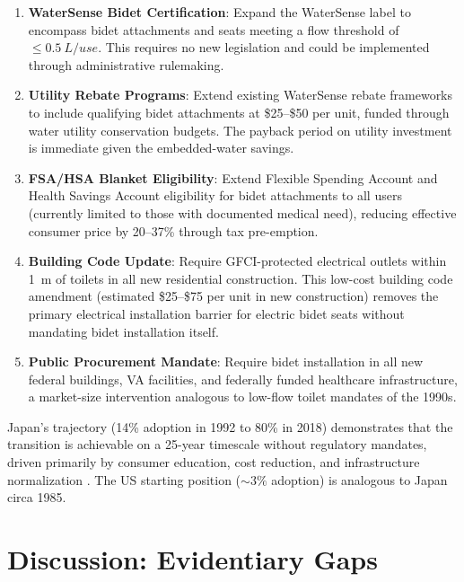 \documentclass[aps,prfluids,reprint,amsmath,amssymb,floatfix]{revtex4-2}
\begin{document}
\begin{enumerate}[leftmargin=*, label=\textbf{P\arabic*.}]
    \item \textbf{WaterSense Bidet Certification}: Expand the WaterSense
    label to encompass bidet attachments and seats meeting a flow threshold
    of $\leq\SI{0.5}{L\per use}$. This requires no new legislation and
    could be implemented through administrative rulemaking.
    \item \textbf{Utility Rebate Programs}: Extend existing WaterSense
    rebate frameworks to include qualifying bidet attachments at \$25--\$50
    per unit, funded through water utility conservation budgets. The payback
    period on utility investment is immediate given the embedded-water savings.
    \item \textbf{FSA/HSA Blanket Eligibility}: Extend Flexible Spending
    Account and Health Savings Account eligibility for bidet attachments
    to all users (currently limited to those with documented medical need),
    reducing effective consumer price by 20--37\% through tax pre-emption.
    \item \textbf{Building Code Update}: Require GFCI-protected electrical
    outlets within \SI{1}{m} of toilets in all new residential construction.
    This low-cost building code amendment (estimated \$25--\$75 per unit in
    new construction) removes the primary electrical installation barrier
    for electric bidet seats without mandating bidet installation itself.
    \item \textbf{Public Procurement Mandate}: Require bidet installation
    in all new federal buildings, VA facilities, and federally funded
    healthcare infrastructure, a market-size intervention analogous to
    low-flow toilet mandates of the 1990s.
\end{enumerate}

Japan's trajectory (14\% adoption in 1992 to 80\% in 2018) demonstrates
that the transition is achievable on a 25-year timescale without regulatory
mandates, driven primarily by consumer education, cost reduction, and
infrastructure normalization \citep{JapaneseCabinet2018}. The US starting
position ($\sim3\%$ adoption) is analogous to Japan circa 1985.

\section{Discussion: Evidentiary Gaps}
\label{sec:discussion}
\end{document}

